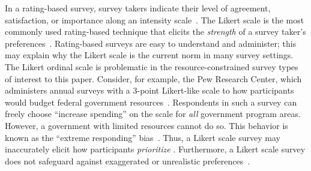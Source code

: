 

In a rating-based survey, survey takers indicate their level of agreement, satisfaction, or importance along an intensity scale~\cite{moors2016two}. The Likert scale is the most commonly used rating-based technique that elicits the \textit{strength} of a survey taker's preferences~\cite{likert1932technique}. Rating-based surveys are easy to understand and administer; this may explain why the Likert scale is the current norm in many survey settings. The Likert ordinal scale is problematic in the resource-constrained survey types of interest to this paper. Consider, for example, the Pew Research Center, which administers annual surveys with a 3-point Likert-like scale to  how participants would budget federal government resources~\cite{pew_spending}. Respondents in such a survey can freely choose  ``increase spending'' on the scale for \textit{all} government program areas. However, a government with limited resources cannot do so. This behavior is known as the ``extreme responding'' bias~\cite{batchelor2016extreme, furnham1986response, meisenberg2008acquiescent}. Thus, a Likert scale survey may  inaccurately elicit how participants \textit{prioritize} . Furthermore, a Likert scale survey does not safeguard against exaggerated or unrealistic preferences~\cite{araujo2017much, vavreck2007exaggerated}.


